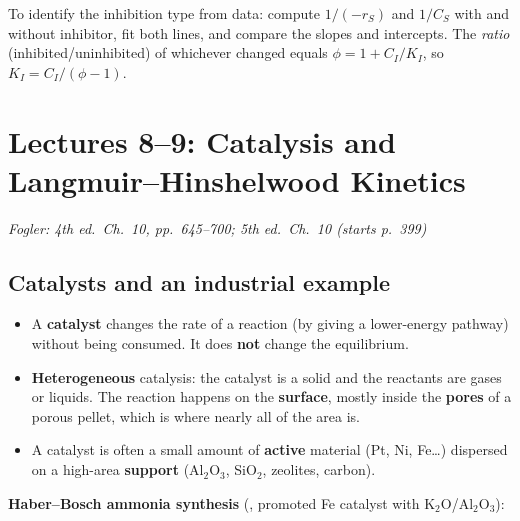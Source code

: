 \documentclass[11pt]{article}
\newcommand{\fogler}[1]{\hfill{\small\textit{\textcolor{keyblue}{Fogler: #1}}}}
\begin{document}
\begin{examtip}
To identify the inhibition type from data: compute $1/(-r_S)$ and $1/C_S$ with and without inhibitor, fit both lines,
and compare the slopes and intercepts. The \emph{ratio} (inhibited/uninhibited) of whichever changed equals
$\phi=1+C_I/K_I$, so $K_I=C_I/(\phi-1)$.
\end{examtip}

\section{Lectures 8--9: Catalysis and Langmuir--Hinshelwood Kinetics}
\fogler{4th ed.\ Ch.~10, pp.~645--700; 5th ed.\ Ch.~10 (starts p.~399)}

\subsection{Catalysts and an industrial example}
\begin{itemize}
\item A \textbf{catalyst} changes the rate of a reaction (by giving a lower-energy pathway) without being consumed.
It does \textbf{not} change the equilibrium.
\item \textbf{Heterogeneous} catalysis: the catalyst is a solid and the reactants are gases or liquids. The reaction
happens on the \textbf{surface}, mostly inside the \textbf{pores} of a porous pellet, which is where nearly all of the area is.
\item A catalyst is often a small amount of \textbf{active} material (Pt, Ni, Fe\ldots) dispersed on a high-area
\textbf{support} (Al$_2$O$_3$, SiO$_2$, zeolites, carbon).
\end{itemize}

\textbf{Haber--Bosch ammonia synthesis} (, promoted Fe catalyst with K$_2$O/Al$_2$O$_3$):
\end{document}
